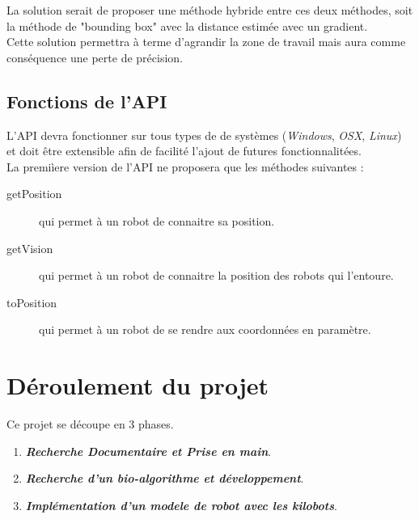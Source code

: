 \documentclass[a4paper,8pt]{report}
\begin{document}
\smallskip
La solution serait de proposer une m\'ethode hybride entre ces deux m\'ethodes, soit la m\'ethode de "bounding box" avec la distance estim\'ee avec un gradient.\\
Cette solution permettra \`a terme d'agrandir la zone de travail mais aura comme cons\'equence une perte de pr\'ecision.\\


\section*{Fonctions de l'API}\label{sec:name}

L'API devra fonctionner sur tous types de de syst\`emes (\textit{Windows}, \textit{OSX}, \textit{Linux}) et doit \^etre extensible afin de facilit\'e l'ajout de futures fonctionnalit\'ees.\\

La premi\`iere version de l'API ne proposera que les m\'ethodes suivantes :

\begin{description}
\item[getPosition] qui permet \`a un robot de connaitre sa position.
\item[getVision] qui permet \`a un robot de connaitre la position des robots qui l'entoure.
\item[toPosition] qui permet \`a un robot de se rendre aux coordonn\'ees en param\`etre.
\end{description}

\chapter{D\'eroulement du projet}

Ce projet se d\'ecoupe en 3 phases.\\

\begin{enumerate}[{Phase}-I ]
\item \textit{\textbf{Recherche Documentaire et Prise en main}}.
\item \textit{\textbf{Recherche d'un bio-algorithme et d\'eveloppement}}.
\item \textit{\textbf{Impl\'ementation d'un modele de robot avec les kilobots}}.
\end{enumerate}
\end{document}

